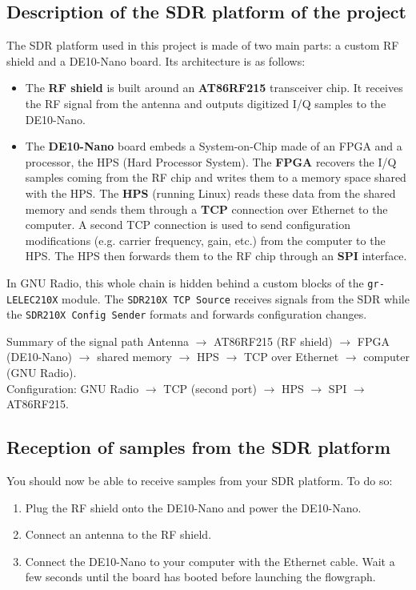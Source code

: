 \subsection{Description of the SDR platform of the project}

The SDR platform used in this project is made of two main parts: a custom RF shield and a DE10-Nano board. Its architecture is as follows:
\begin{itemize}
    \item The \textbf{RF shield} is built around an \textbf{AT86RF215} transceiver chip. It receives the RF signal from the antenna and outputs digitized I/Q samples to the DE10-Nano.
    \item The \textbf{DE10-Nano} board embeds a System-on-Chip made of an FPGA and a processor, the HPS (Hard Processor System). The \textbf{FPGA} recovers the I/Q samples coming from the RF chip and writes them to a memory space shared with the HPS. The \textbf{HPS} (running Linux) reads these data from the shared memory and sends them through a \textbf{TCP} connection over Ethernet to the computer. A second TCP connection is used to send configuration modifications (e.g. carrier frequency, gain, etc.) from the computer to the HPS. The HPS then forwards them to the RF chip through an \textbf{SPI} interface.
\end{itemize}

In GNU Radio, this whole chain is hidden behind a custom blocks of the \texttt{gr-LELEC210X} module. The \texttt{SDR210X TCP Source} receives signals from the SDR while the \texttt{SDR210X Config Sender} formats and forwards configuration changes.

\begin{bclogo}[couleur = gray!20, arrondi = 0.2, logo=\bcinfo]{Summary of the signal path}
Antenna $\rightarrow$ AT86RF215 (RF shield) $\rightarrow$ FPGA (DE10-Nano) $\rightarrow$ shared memory $\rightarrow$ HPS $\rightarrow$ TCP over Ethernet $\rightarrow$ computer (GNU Radio).\\
Configuration: GNU Radio $\rightarrow$ TCP (second port) $\rightarrow$ HPS $\rightarrow$ SPI $\rightarrow$ AT86RF215.
\end{bclogo}

\subsection{Reception of samples from the SDR platform}

You should now be able to receive samples from your SDR platform. To do so:
\begin{enumerate}
    \item Plug the RF shield onto the DE10-Nano and power the DE10-Nano.
    \item Connect an antenna to the RF shield.
    \item Connect the DE10-Nano to your computer with the Ethernet cable. Wait a few seconds until the board has booted before launching the flowgraph.
\end{enumerate}

